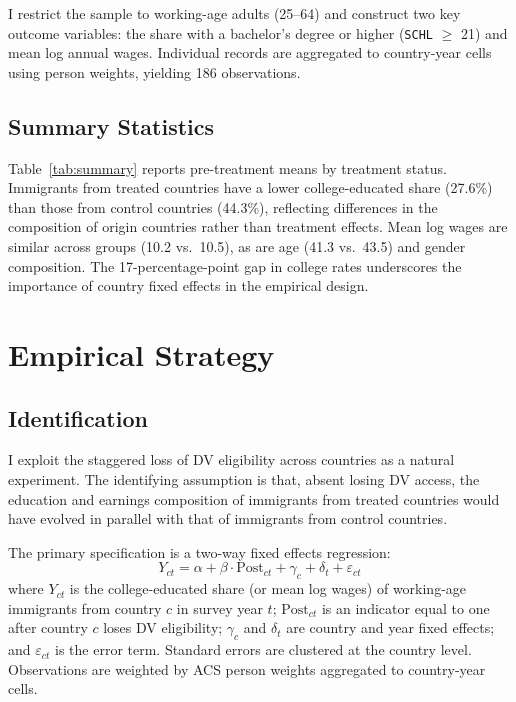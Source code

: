 \documentclass[12pt]{article}
\begin{document}
I restrict the sample to working-age adults (25--64) and construct two key outcome variables: the share with a bachelor's degree or higher (\texttt{SCHL} $\geq$ 21) and mean log annual wages. Individual records are aggregated to country-year cells using person weights, yielding 186 observations.

\subsection{Summary Statistics}



Table~\ref{tab:summary} reports pre-treatment means by treatment status. Immigrants from treated countries have a lower college-educated share (27.6\%) than those from control countries (44.3\%), reflecting differences in the composition of origin countries rather than treatment effects. Mean log wages are similar across groups (10.2 vs.\ 10.5), as are age (41.3 vs.\ 43.5) and gender composition. The 17-percentage-point gap in college rates underscores the importance of country fixed effects in the empirical design.

\section{Empirical Strategy}

\subsection{Identification}

I exploit the staggered loss of DV eligibility across countries as a natural experiment. The identifying assumption is that, absent losing DV access, the education and earnings composition of immigrants from treated countries would have evolved in parallel with that of immigrants from control countries.

The primary specification is a two-way fixed effects regression:
\begin{equation}
Y_{ct} = \alpha + \beta \cdot \text{Post}_{ct} + \gamma_c + \delta_t + \varepsilon_{ct}
\label{eq:twfe}
\end{equation}
where $Y_{ct}$ is the college-educated share (or mean log wages) of working-age immigrants from country $c$ in survey year $t$; $\text{Post}_{ct}$ is an indicator equal to one after country $c$ loses DV eligibility; $\gamma_c$ and $\delta_t$ are country and year fixed effects; and $\varepsilon_{ct}$ is the error term. Standard errors are clustered at the country level. Observations are weighted by ACS person weights aggregated to country-year cells.
\end{document}
